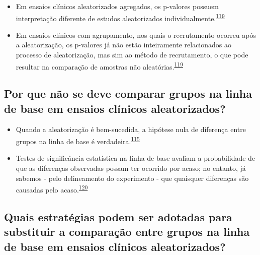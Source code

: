 \documentclass[
]{book}
\begin{document}
\begin{itemize}
\item
  Em ensaios clínicos aleatorizados agregados, os p-valores possuem interpretação diferente de estudos aleatorizados individualmente.\textsuperscript{\protect\hyperlink{ref-Bolzern2019}{119}}
\item
  Em ensaios clínicos com agrupamento, nos quais o recrutamento ocorreu após a aleatorização, os p-valores já não estão inteiramente relacionados ao processo de aleatorização, mas sim ao método de recrutamento, o que pode resultar na comparação de amostras não aleatórias.\textsuperscript{\protect\hyperlink{ref-Bolzern2019}{119}}
\end{itemize}

\hypertarget{por-que-nuxe3o-se-deve-comparar-grupos-na-linha-de-base-em-ensaios-cluxednicos-aleatorizados}{%
\subsection{Por que não se deve comparar grupos na linha de base em ensaios clínicos aleatorizados?}\label{por-que-nuxe3o-se-deve-comparar-grupos-na-linha-de-base-em-ensaios-cluxednicos-aleatorizados}}

\begin{itemize}
\item
  Quando a aleatorização é bem-sucedida, a hipótese nula de diferença entre grupos na linha de base é verdadeira.\textsuperscript{\protect\hyperlink{ref-roberts1999}{115}}
\item
  Testes de significância estatística na linha de base avaliam a probabilidade de que as diferenças observadas possam ter ocorrido por acaso; no entanto, já sabemos - pelo delineamento do experimento - que quaisquer diferenças são causadas pelo acaso.\textsuperscript{\protect\hyperlink{ref-gruijters2020}{120}}
\end{itemize}

\hypertarget{quais-estratuxe9gias-podem-ser-adotadas-para-substituir-a-comparauxe7uxe3o-entre-grupos-na-linha-de-base-em-ensaios-cluxednicos-aleatorizados}{%
\subsection{Quais estratégias podem ser adotadas para substituir a comparação entre grupos na linha de base em ensaios clínicos aleatorizados?}\label{quais-estratuxe9gias-podem-ser-adotadas-para-substituir-a-comparauxe7uxe3o-entre-grupos-na-linha-de-base-em-ensaios-cluxednicos-aleatorizados}}
\end{document}
